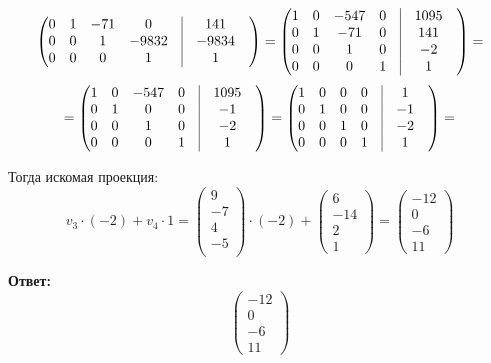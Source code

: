 \documentclass[a4paper,12pt]{article}
\begin{document}
\begin{enumerate}
\[\begin{pmatrix}
0 & 1 & -71 & 0 & \vrule &141 & \\
0 & 0 & 1 & -9832 & \vrule &-9834 & \\
0 & 0 & 0 & 1 & \vrule &1 & \\
\end{pmatrix}
=
\begin{pmatrix}
1 & 0 & -547 & 0 & \vrule &1095 & \\
0 & 1 & -71 & 0 & \vrule &141 & \\
0 & 0 & 1 & 0 & \vrule &-2 & \\
0 & 0 & 0 & 1 & \vrule &1 & \\
\end{pmatrix}
=
\]
\[
=
\begin{pmatrix}
1 & 0 & -547 & 0 & \vrule &1095 & \\
0 & 1 & 0 & 0 & \vrule &-1 & \\
0 & 0 & 1 & 0 & \vrule &-2 & \\
0 & 0 & 0 & 1 & \vrule &1 & \\
\end{pmatrix}
=
\begin{pmatrix}
1 & 0 & 0 & 0 & \vrule &1 & \\
0 & 1 & 0 & 0 & \vrule &-1 & \\
0 & 0 & 1 & 0 & \vrule &-2 & \\
0 & 0 & 0 & 1 & \vrule &1 & \\
\end{pmatrix}
=
\]
\end{enumerate}
Тогда искомая проекция:
\[
v_3 \cdot (-2) + v_4 \cdot 1 =
\begin{pmatrix}
9 \\
-7\\
4 \\
-5\\
\end{pmatrix}
\cdot (-2) + 
\begin{pmatrix}
6\\-14\\2\\1
\end{pmatrix}
=
\left(\begin{matrix}
-12 \\
0 \\
-6 \\
11
\end{matrix}\right)
\]
{\LARGE \begin{center}
\textbf{Ответ: } 
\[
\left(\begin{matrix}
-12 \\
0 \\
-6 \\
11
\end{matrix}\right)
\]
\end{center}}
\clearpage
\end{document}
